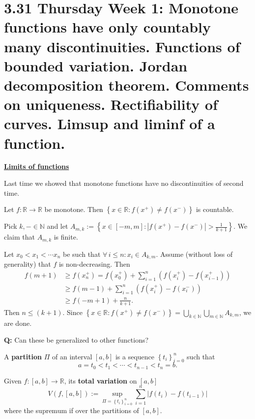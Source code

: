 \documentclass{notes}
\begin{document}
  \section{3.31 Thursday Week 1: Monotone functions have only countably many discontinuities. Functions of bounded variation. Jordan decomposition theorem. Comments on uniqueness. Rectifiability of curves. Limsup and liminf of a function.}
  
  \underline{\boldmath \bfseries Limits of functions}
  
  Last time we showed that monotone functions have no discontinuities of second time.

  \begin{lem}
    Let $f \colon \mathbb R \to \mathbb R$ be monotone.
    Then $\left \{ x \in \mathbb R : f(x^+) \neq f(x^-) \right \}$ is countable.
  \end{lem}
  
  \begin{prf}
    Pick $k, - \in \mathbb N$ and let $A_{m, k} := \left \{ x \in [-m, m] : \left | f(x^+) - f(x^-) \right | > \frac{1}{k + 1} \right \}$.
    We claim that $A_{m, k}$ is finite.
    
    Let $x_{0} < x_{1} < \cdots x_n$ be such that $\forall \, i \leq n: x_i \in A_{k, m}$.
    Assume (without loss of generality) that $f$ is non-decreasing.
    Then 
    \begin{align}
      f(m + 1) &\geq f(x_n^+) = f(x_0^+) + \sum_{i = 1}^n \left ( f(x_i^+) - f(x_{i - 1}^+) \right ) \nonumber \\ 
      &\geq f(m - 1) + \sum_{i = 1}^n \left ( f(x_i^+) - f(x_i^-) \right ) \nonumber \\ 
      &\geq f(-m + 1) + \frac{n}{k + 1}.
    \end{align}
    Then $n \leq (k + 1)$.
    Since $\left \{ x \in \mathbb R : f(x^+) \neq f(x^-) \right \} = \bigcup_{k \in \mathbb N} \bigcup_{m \in \mathbb N} A_{k, m}$, we are done.
  \end{prf}
  
  {\boldmath \bfseries  Q:} Can these be generalized to other functions?

  \begin{defn}
    A {\boldmath \bfseries partition} $\Pi$ of an interval $[a, b]$ is a sequence $\left \{ t_i \right \}_{i = 0}^n$ such that 
    \[
      a = t_0 < t_{1} < \cdots < t_{n - 1} < t_n = b.
    \]
  \end{defn}
  
  \begin{defn}
    Given $f \colon [a, b] \to \mathbb R$, its {\boldmath \bfseries total variation} on $[a, b]$
    \[
      V(f, [a, b]) := \sup_{\Pi = \left \{ t_i \right \}_{i = 0}^n} \sum_{i = 1}^n \left | f(t_i) - f(t_{i - 1}) \right | 
    \]
    where the supremum if over the partitions of $[a, b]$.
  \end{defn}
  
\end{document}
